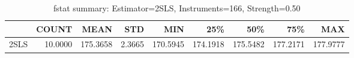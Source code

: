 \begin{table}[ht]
\centering
\caption{fstat summary: Estimator=2SLS, Instruments=166, Strength=0.50}
\begin{tabular}{lrrrrrrrr}
\toprule
 & COUNT & MEAN & STD & MIN & 25\% & 50\% & 75\% & MAX \\
\midrule
2SLS & 10.0000 & 175.3658 & 2.3665 & 170.5945 & 174.1918 & 175.5482 & 177.2171 & 177.9777 \\
\bottomrule
\end{tabular}
\end{table}
